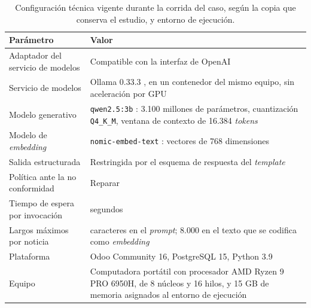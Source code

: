 \documentclass[12pt]{report}
\begin{document}
\begin{table}[H]
  \centering
  \footnotesize
  \caption{Configuración técnica vigente durante la corrida del caso, según la copia que conserva el estudio, y entorno de ejecución.}
  \label{tab:ej-config-tecnica}
  \begin{tabularx}{\textwidth}{@{}>{\raggedright\arraybackslash}p{4.6cm} >{\raggedright\arraybackslash}X@{}}
    \toprule
    \textbf{Parámetro}                & \textbf{Valor}                                                                                                                                     \\
    \midrule
    Adaptador del servicio de modelos & Compatible con la interfaz de OpenAI                                                                                                               \\
    Servicio de modelos               & Ollama 0.33.3 \citep{ollama:2026}, en un contenedor del mismo equipo, sin aceleración por GPU                                                      \\
    Modelo generativo                 & \texttt{qwen2.5:3b} \citep{qwen:2024}: 3.100 millones de parámetros, cuantización \texttt{Q4\_K\_M}, ventana de contexto de 16.384 \textit{tokens} \\
    Modelo de \textit{embedding}      & \texttt{nomic-embed-text} \citep{nussbaum:2025}: vectores de 768 dimensiones                                                                       \\
    Salida estructurada               & Restringida por el esquema de respuesta del \textit{template}                                                                                      \\
    Política ante la no conformidad   & Reparar                                                                                                                                            \\
    Tiempo de espera por invocación   & 900 segundos                                                                                                                                       \\
    Largos máximos por noticia        & 4.000 caracteres en el \textit{prompt}; 8.000 en el texto que se codifica como \textit{embedding}                                                  \\
    \midrule
    Plataforma                        & Odoo Community 16, PostgreSQL 15, Python 3.9                                                                                                       \\
    Equipo                            & Computadora portátil con procesador AMD Ryzen 9 PRO 6950H, de 8 núcleos y 16 hilos, y 15 GB de memoria asignados al entorno de ejecución           \\
    \bottomrule
  \end{tabularx}
\end{table}
\end{document}
